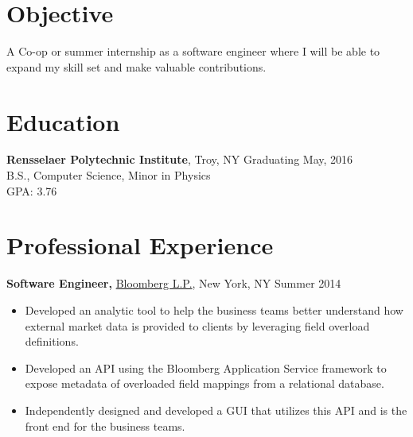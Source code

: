 \documentclass[margin]{res}
\begin{document}
 

 
\address{{\bf Present Address} \\ 2166 14th St \\ 2nd Floor \\ Troy, NY 12180 }
\address{{\bf Permanent Address} \\ 4 Oak Street \\ Cumberland, ME 04021 }
\begin{resume} 
 
\section{Objective} 
A Co-op or summer internship as a software engineer where I will be able to expand my skill set and make valuable contributions. %

\section{Education} 
{\bf Rensselaer Polytechnic Institute}, Troy, NY \hfill Graduating May, 2016 \\
B.S., Computer Science, Minor in Physics \\
GPA: 3.76
 

\section{Professional Experience}
{\bf Software Engineer,} \uline{Bloomberg L.P.}, New York, NY \hfill Summer 2014
 \begin{itemize} \itemsep -2pt
 \item Developed an analytic tool to help the business teams better understand how external market data is provided to clients by leveraging field overload definitions.
 \item Developed an API using the Bloomberg Application Service framework to expose metadata of overloaded field mappings from a relational database.
 \item Independently designed and developed a GUI that utilizes this API and is the front end for the business teams.
 \end{itemize}




\end{resume}
\end{document}
